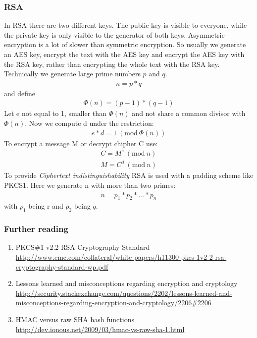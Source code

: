 \documentclass{scrartcl}
\begin{document}
\subsubsection{RSA}
In RSA there are two different keys. The public key is visible to everyone, while the private key is only visible to the generator of both keys.  Asymmetric encryption is a lot of slower than symmetric encryption. So usually we generate an AES key, encrypt the text with the AES key and encrypt the AES key with the RSA key, rather than encrypting the whole text with the RSA key.
 Technically we generate large prime numbers $p$ and $q$.
\begin{eqnarray*}
 n = p *q 
\end{eqnarray*}
 and define
\begin{eqnarray*}
 \Phi(n) = (p-1)*(q-1)
\end{eqnarray*}
 Let e not equal to 1, smaller than $ \Phi(n)$ and not share a common divisor with $ \Phi(n)$.
 Now we compute d under the restriction:
 \newcommand{\Mod}[1]{\ (\text{mod}\ #1)}
\begin{eqnarray*}
 e*d = 1 \Mod{\Phi(n)}
\end{eqnarray*}
 To encrypt a message M or decrypt chipher C use:
\begin{eqnarray*}
 C = M^e \Mod{n}\\
 M = C^d \Mod{n}
\end{eqnarray*}
 To provide \textit{Ciphertext indistinguishability} RSA is used with a padding scheme like PKCS1. Here we generate n with more than two primes:
 \begin{eqnarray*}
 n = p_1*p_2*...*p_n
\end{eqnarray*}
with $p_1$ being r and $p_2$ being $q$.


\subsubsection{Further reading}
\begin{enumerate}
\item PKCS\#1 v2.2 RSA Cryptography Standard\\\url{http://www.emc.com/collateral/white-papers/h11300-pkcs-1v2-2-rsa-cryptography-standard-wp.pdf} 
\item Lessons learned and misconceptions regarding encryption and cryptology \\\url{
http://security.stackexchange.com/questions/2202/lessons-learned-and-misconceptions-regarding-encryption-and-cryptology/2206#2206}
\item HMAC versus raw SHA hash functions \\\url{
http://dev.ionous.net/2009/03/hmac-vs-raw-sha-1.html}
\end{enumerate}
\end{document}
